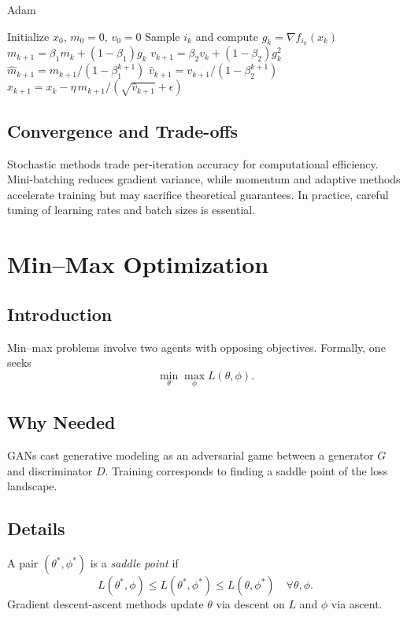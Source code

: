 \begin{algorithm}
\caption{Adam}
\begin{algorithmic}[1]
\STATE Initialize $x_0$, $m_0=0$, $v_0=0$
    \STATE Sample $i_k$ and compute $g_k=\nabla f_{i_k}(x_k)$
    \STATE $m_{k+1}=\beta_1 m_k + (1-\beta_1)g_k$
    \STATE $v_{k+1}=\beta_2 v_k + (1-\beta_2)g_k^2$
    \STATE $\hat{m}_{k+1}=m_{k+1}/(1-\beta_1^{k+1})$
    \STATE $\hat{v}_{k+1}=v_{k+1}/(1-\beta_2^{k+1})$
    \STATE $x_{k+1}=x_k-\eta\,\hat{m}_{k+1}/(\sqrt{\hat{v}_{k+1}}+\epsilon)$
\ENDFOR
\end{algorithmic}
\end{algorithm}

\subsection{Convergence and Trade-offs}
Stochastic methods trade per-iteration accuracy for computational efficiency. Mini-batching reduces gradient variance, while momentum and adaptive methods accelerate training but may sacrifice theoretical guarantees. In practice, careful tuning of learning rates and batch sizes is essential.

\section{Min--Max Optimization}
\subsection{Introduction}
Min--max problems involve two agents with opposing objectives. Formally, one seeks
\begin{equation}
\min_{\theta} \max_{\phi} L(\theta,\phi).
\end{equation}

\subsection{Why Needed}
GANs cast generative modeling as an adversarial game between a generator $G$ and discriminator $D$. Training corresponds to finding a saddle point of the loss landscape.

\subsection{Details}
A pair $(\theta^*,\phi^*)$ is a \emph{saddle point} if
\begin{equation}
L(\theta^*,\phi)\le L(\theta^*,\phi^*)\le L(\theta,\phi^*)\quad\forall\theta,\phi.
\end{equation}
Gradient descent-ascent methods update $\theta$ via descent on $L$ and $\phi$ via ascent.

